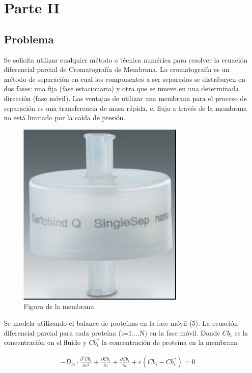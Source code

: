 \section{Parte II}

\subsection{Problema}

\par Se solicita  utilizar cualquier método o técnica numérica para resolver la ecuación diferencial parcial de Cromatografía de Membrana. La cromatografía es un método de separación en cual los componentes a ser separados se distribuyen en dos fases: una fija (fase estacionaria) y otra que se mueve en una determinada dirección (fase móvil). Las ventajas de utilizar una membrana para el proceso de separación es una transferencia de masa rápida, el flujo a través de la membrana no está limitado por la caída de presión.

\begin{figure}[!ht]
	\centering
	\includegraphics[scale=0.7]{Imagenes/membrana.png}
	\caption{Figura de la membrana}
	\label{fig:ej}
\end{figure}

Se modela utilizando el balance de proteínas en la fase móvil (5). La ecuación diferencial parcial para cada proteína (i=1....N) en la fase móvil. Donde $Cb_{i}$ es la concentración en el fluido y $Cb^*_{i}$ la concentración de proteína en la membrana

\begin{equation}
\begin{split}
       -D_{bi}\cdot\frac{\partial^2 Cb_{i}}{\partial z^2}+\frac{\partial Cb_{i}}{\partial z}+\frac{\partial Cb_{i}}{\partial t}+ \varepsilon(Cb_{i}-Cb^*_{i}) = 0
\end{split}
\end{equation}

